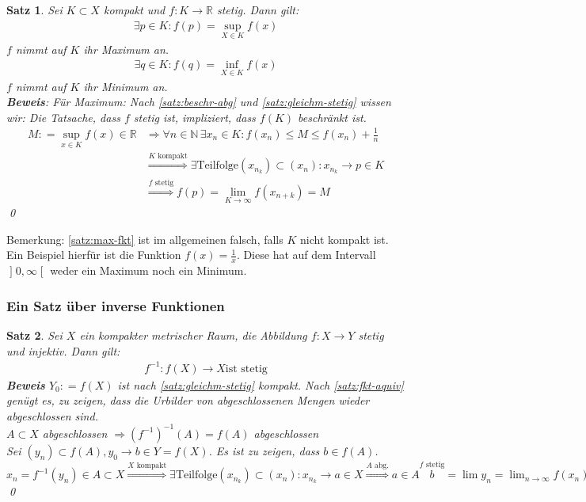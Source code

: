 \documentclass[ngerman,titlepage,twoside, parskip=half*]{scrreprt}
\newcommand*{\N}{\mathbb{N}}
\newcommand*{\R}{\mathbb{R}}
\theoremstyle{plain}
\newtheorem{theorem}{Satz}[section]
\theoremstyle{definition}
\theoremstyle{remark}
\newcommand*{\coloneqq}{\mathrel{\mathop:}=}
\newcommand*{\bsofint}[1]{\mathopen{]}#1\mathclose{[}} %
\begin{document}
\begin{theorem}
\label{satz:max-fkt}
Sei $K\subset X$ kompakt und $f\colon K\rightarrow\R$ stetig. Dann gilt:
\begin{gather*}\exists p \in K\colon f(p)=\sup_{X\in K}f(x)\end{gather*}
$f$ nimmt auf $K$ ihr Maximum an.
\begin{gather*}\exists q \in K\colon f(q)=\inf_{X\in K}f(x)\end{gather*}
$f$ nimmt auf $K$ ihr Minimum an.\\
\textbf{Beweis}: Für Maximum: Nach \autoref{satz:beschr-abg} und \autoref{satz:gleichm-stetig} wissen wir: Die Tatsache, dass
$f$ stetig ist, impliziert, dass $f(K)$ beschränkt ist.
\begin{align*}
  M\coloneqq\sup_{x\in K} f(x)\in\R & \Rightarrow \forall n \in \N\,\exists x_n\in K\colon f(x_n)\leq M\leq f(x_n)+\frac{1}{n}\\
  & \stackrel{K\text{~kompakt}}{\Rightarrow} \exists \text{Teilfolge} (x_{n_k})\subset (x_n)\colon x_{n_k}\rightarrow p\in K\\
  & \stackrel{f\text{~stetig}}{\Rightarrow} f(p)=\lim_{K\rightarrow \infty} f(x_{n+k})=M
\end{align*}
\qed
\end{theorem}

Bemerkung: \autoref{satz:max-fkt} ist im allgemeinen falsch, falls $K$ nicht kompakt ist. Ein Beispiel hierfür ist
die Funktion $f(x)=\frac{1}{x}$. Diese hat auf dem Intervall $\bsofint{0,\infty}$ weder ein Maximum noch ein Minimum.

\subsubsection{Ein Satz über inverse Funktionen}
\begin{theorem}
\label{satz:invFunkt}
Sei $X$ ein kompakter metrischer Raum, die Abbildung $f\colon X\rightarrow Y$ stetig und injektiv. Dann gilt:
\begin{gather*}f^{-1}\colon f(X)\rightarrow X\text{ist stetig}\end{gather*}
\textbf{Beweis} $Y_0 \coloneqq f(X)$ ist nach \autoref{satz:gleichm-stetig} kompakt. Nach \autoref{satz:fkt-aquiv} genügt es,
zu zeigen, dass die Urbilder von abgeschlossenen Mengen wieder abgeschlossen sind.\\
$A\subset X$ abgeschlossen $\Rightarrow (f^{-1})^{-1}(A)=f(A)$ abgeschlossen\\
Sei $(y_n)\subset f(A), y_0\rightarrow b\in Y=f(X)$. Es ist zu zeigen, dass $b\in f(A)$.\\
$x_n=f^{-1}(y_n)\in A\subset X\stackrel{X\text{~kompakt}}{\Rightarrow} \exists \text{Teilfolge}(x_{n_k})\subset (x_n)
\colon x_{n_k}\rightarrow a\in X\stackrel{A\text{~abg.}}{\Rightarrow} a\in A\stackrel{f\text{~stetig}} b=\lim y_n=
\lim_{n\rightarrow\infty}f(x_n)=\lim_{k\rightarrow\infty}f(x_{n_k})=f(a)\in f(A)$
\qed
\end{theorem}
\end{document}
